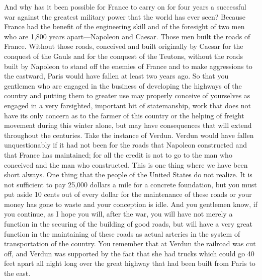 \begin{linenumbers*}
\indent And why has it been possible for France to carry on for four years a successful war against the greatest military power that the world has ever seen? Because France had the benefit of the engineering skill and of the foresight of two men who are 1,800 years apart—Napoleon and Caesar. Those men built the roads of France. Without those roads, conceived and built originally by Caesar for the conquest of the Gauls and for the conquest of the Teutons, without the roads built by Napoleon to stand off the enemies of France and to make aggressions to the eastward, Paris would have fallen at least two years ago. So that you gentlemen who are engaged in the business of developing the highways of the country and putting them to greater use may properly conceive of yourselves as engaged in a very farsighted, important bit of statemanship, work that does not have its only concern as to the farmer of this country or the helping of freight movement during this winter alone, but may have consequences that will extend throughout the centuries. Take the instance of Verdun. Verdun would have fallen unquestionably if it had not been for the roads that Napoleon constructed and that France has maintained; for all the credit is not to go to the man who conceived and the man who constructed. This is one thing where we have been short always. One thing that the people of the United States do not realize. It is not sufficient to pay 25,000 dollars a mile for a concrete foundation, but you must put aside 10 cents out of every dollar for the maintenance of these roads or your money has gone to waste and your conception is idle. And you gentlemen know, if you continue, as I hope you will, after the war, you will have not merely a function in the securing of the building of good roads, but will have a very great function in the maintaining of these roads as actual arteries in the system of transportation of the country. You remember that at Verdun the railroad was cut off, and Verdun was supported by the fact that she had trucks which could go 40 feet apart all night long over the great highway that had been built from Paris to the east.


\end{linenumbers*}
